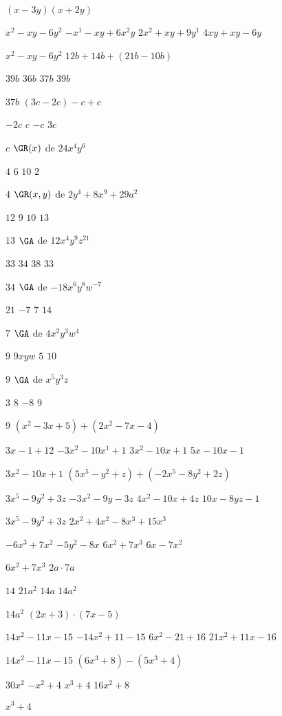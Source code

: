 $(x-3y)(x+2y)$
\begin{enum}
	\ii $x^2-xy-6y^2$
	\ii $-x^1-xy+6x^2y$
	\ii $2x^2+xy+9y^1$
	\ii $4xy+xy-6y$
\end{enum}
$x^2-xy-6y^2$
$12b+14b+(21b-10b)$
\begin{enum}
	\ii $39b$
	\ii $36b$
	\ii $37b$
	\ii $39b$
\end{enum}
$37b$
$(3c-2c)-c+c$
\begin{enum}
	\ii $-2c$
	\ii $c$
	\ii $-c$
	\ii $3c$
\end{enum}
$c$
$\GR(x)$ de $24x^4y^6$
\begin{enum}
	\ii $4$
	\ii $6$
	\ii $10$
	\ii $2$
\end{enum}
$4$
$\GR(x,y)$ de $2y^4+8x^9+29a^2$
\begin{enum}
	\ii $12$
	\ii $9$
	\ii $10$
	\ii $13$
\end{enum}
$13$
$\GA$ de $12x^4y^9z^{21}$
\begin{enum}
	\ii $33$
	\ii $34$
	\ii $38$
	\ii $33$
\end{enum}
$34$
$\GA$ de $-18x^6y^8w^{-7}$
\begin{enum}
	\ii $21$
	\ii $-7$
	\ii $7$
	\ii $14$
\end{enum}
$7$
$\GA$ de $4x^2y^3w^4$
\begin{enum}
	\ii $9$
	\ii $9xyw$
	\ii $5$
	\ii $10$
\end{enum}
$9$
$\GA$ de $x^5y^3z$
\begin{enum}
	\ii $3$
	\ii $8$
	\ii $-8$
	\ii $9$
\end{enum}
$9$
$(x^2-3x+5)+(2x^2-7x-4)$
\begin{enum}
	\ii $3x-1+12$
	\ii $-3x^2-10x^1+1$
	\ii $3x^2-10x+1$
	\ii $5x-10x-1$
\end{enum}
$3x^2-10x+1$
$(5x^5-y^2+z)+(-2x^5-8y^2+2z)$
\begin{enum}
	\ii $3x^5-9y^2+3z$
	\ii $-3x^2-9y-3z$
	\ii $4x^2-10x+4z$
	\ii $10x-8yz-1$
\end{enum}
$3x^5-9y^2+3z$
$2x^2+4x^2-8x^3+15x^3$
\begin{enum}
	\ii $-6x^3+7x^2$
	\ii $-5y^2-8x$
	\ii $6x^2+7x^3$
	\ii $6x-7x^2$
\end{enum}
$6x^2+7x^3$
$2a\cdot 7a$
\begin{enum}
	\ii $14$
	\ii $21a^2$
	\ii $14a$
	\ii $14a^2$
\end{enum}
$14a^2$
$(2x+3)\cdot(7x-5)$
\begin{enum}
	\ii $14x^2-11x-15$
	\ii $-14x^2+11-15$
	\ii $6x^2-21+16$
	\ii $21x^2+11x-16$
\end{enum}
$14x^2-11x-15$
$(6x^3+8)-(5x^3+4)$
\begin{enum}
	\ii $30x^2$
	\ii $-x^2+4$
	\ii $x^3+4$
	\ii $16x^2+8$
\end{enum}
$x^3+4$
